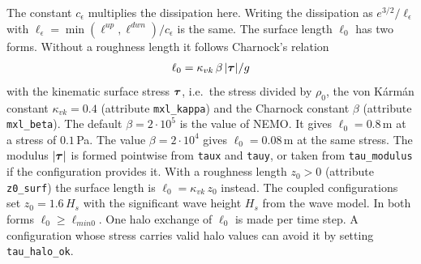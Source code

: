 \documentclass[12pt]{article}
\newcommand{\beeq}  { \begin{eqnarray*} }
\newcommand{\eeeq}  { \end{eqnarray*}}
\renewcommand{\v}[1]{{\mbox{\boldmath$ #1 $}}}  %
\begin{document}
The constant $c_\epsilon$ multiplies the dissipation here.
Writing the dissipation as $e^{3/2}/\ell_\epsilon$ with $\ell_\epsilon = \min(\ell^{up}, \ell^{dwn})/c_\epsilon$ is the same.
The surface length $\ell_0$ has two forms.
Without a roughness length it follows Charnock's relation
\beeq
 \ell_0 = \kappa_{vk}\, \beta\, |\v \tau| / g
\eeeq
with the kinematic surface stress $\v \tau$, i.e.\ the stress divided by $\rho_0$,
the von K\'arm\'an constant $\kappa_{vk} = 0.4$ (attribute \verb|mxl_kappa|)
and the Charnock constant $\beta$ (attribute \verb|mxl_beta|).
The default $\beta = 2\cdot 10^5$ is the value of NEMO. It gives $\ell_0 = 0.8\,$m at a stress of $0.1\,$Pa.
The value $\beta = 2\cdot 10^4$ gives $\ell_0 = 0.08\,$m at the same stress.
The modulus $|\v \tau|$ is formed pointwise from \verb|taux| and \verb|tauy|,
or taken from \verb|tau_modulus| if the configuration provides it.
With a roughness length $z_0 > 0$ (attribute \verb|z0_surf|) the surface length is $\ell_0 = \kappa_{vk}\, z_0$ instead.
The coupled configurations set $z_0 = 1.6\, H_s$ with the significant wave height $H_s$ from the wave model.
In both forms $\ell_0 \ge \ell_{min0}$.
One halo exchange of $\ell_0$ is made per time step.
A configuration whose stress carries valid halo values can avoid it by setting \verb|tau_halo_ok|.
\end{document}
